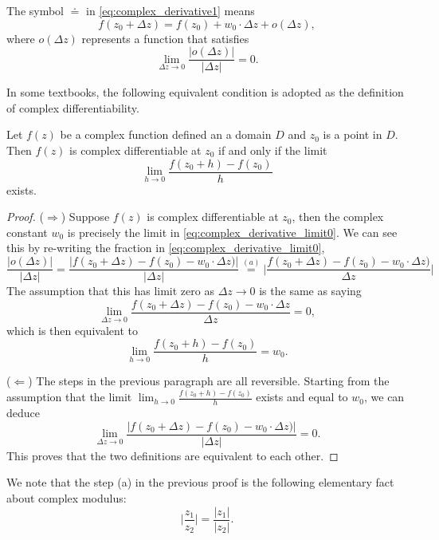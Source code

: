 The symbol $\doteq$ in \eqref{eq:complex_derivative1} means 
$$
f(z_0 + \Delta z) = f(z_0) + w_0 \cdot \Delta z + o(\Delta z),
$$
where $o(\Delta z)$ represents a function that satisfies 
\begin{equation}
	\lim_{\Delta z \rightarrow 0} \frac{|o(\Delta z)|}{|\Delta z|} = 0.
	\label{eq:complex_derivative_limit0}
\end{equation}

In some textbooks, the following equivalent condition is adopted as the definition of complex differentiability.

\begin{svgraybox}
	\begin{theorem} 
Let $f(z)$ be a complex function defined  an a domain $D$ and $z_0$ is a point in $D$.	Then $f(z)$ is complex differentiable at $z_0$ if and only if the limit 
		\begin{equation}
			\lim_{h \rightarrow 0} \frac{f(z_0+h) -f(z_0)}{h}
			\label{eq:complex_derivative_limit}
		\end{equation}
		exists. 
	\end{theorem}
\end{svgraybox}

\begin{proof}
($\Rightarrow$) Suppose $f(z)$ is complex differentiable at $z_0$, then the complex constant $w_0$ is precisely the limit in \eqref{eq:complex_derivative_limit0}. We can see this by re-writing the fraction in \eqref{eq:complex_derivative_limit0},
$$
\frac{|o(\Delta z)|}{|\Delta z|} =
\frac{|f(z_0+\Delta z) - f(z_0) - w_0 \cdot \Delta z)|}{|\Delta z|} \stackrel{(a)}{=}
\Big| \frac{f(z_0+\Delta z) - f(z_0) - w_0 \cdot \Delta z)}{\Delta z} \Big|
$$
The assumption that this has limit  zero  as $\Delta z\rightarrow 0$ is the same as saying
$$
\lim_{\Delta z\rightarrow 0} \frac{f(z_0+\Delta z) - f(z_0) - w_0 \cdot \Delta z}{\Delta z} = 0, 
$$
which is then equivalent to
$$
\lim_{h \rightarrow 0} \frac{f(z_0+h) - f(z_0)}{h} = w_0. 
$$

($\Leftarrow$) The steps in the previous paragraph are all reversible. Starting from the assumption that the limit $\lim_{h\rightarrow 0} \frac{f(z_0+h) - f(z_0)}{h}$ exists and equal to $w_0$, we can deduce 
$$
\lim_{\Delta z\rightarrow 0} \frac{|f(z_0+\Delta z) - f(z_0) - w_0 \cdot \Delta z)|}{|\Delta z|} = 0.
$$
This proves that the two definitions are equivalent to each other.
\end{proof}


We note that the step (a) in the previous proof is the following elementary fact about complex modulus:
$$
\Big| \frac{z_1}{z_2} \Big| = \frac{|z_1|}{|z_2|}.
$$



